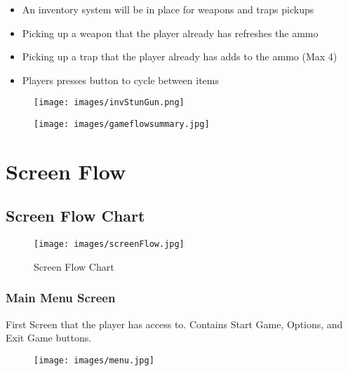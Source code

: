 \documentclass[10pt]{report}
\begin{document}
\begin{minipage}{.8\linewidth}
    \begin{itemize}
        \item An inventory system will be in place for weapons and traps pickups
        \item Picking up a weapon that the player already has refreshes the ammo
        \item Picking up a trap that the player already has adds to the ammo (Max 4)
        \item Players presses button to cycle between items    
    \end{itemize}
\end{minipage}\hfill
\begin{minipage}{.18\linewidth}
    \begin{figure}[H]
        \texttt{[image: images/invStunGun.png]}
    \end{figure}
\end{minipage}


\begin{figure}
    \texttt{[image: images/gameflowsummary.jpg]}
\end{figure}


\section{Screen Flow}

\subsection{Screen Flow Chart}

\begin{figure}[H]
    \centering
    \texttt{[image: images/screenFlow.jpg]}
    \caption{Screen Flow Chart}
\end{figure}

\subsubsection{Main Menu Screen}

First Screen that the player has access to. Contains Start Game, Options, and Exit Game buttons.

\begin{figure}[H]
    \centering
    \texttt{[image: images/menu.jpg]}
    \caption{}
\end{figure}
\end{document}
